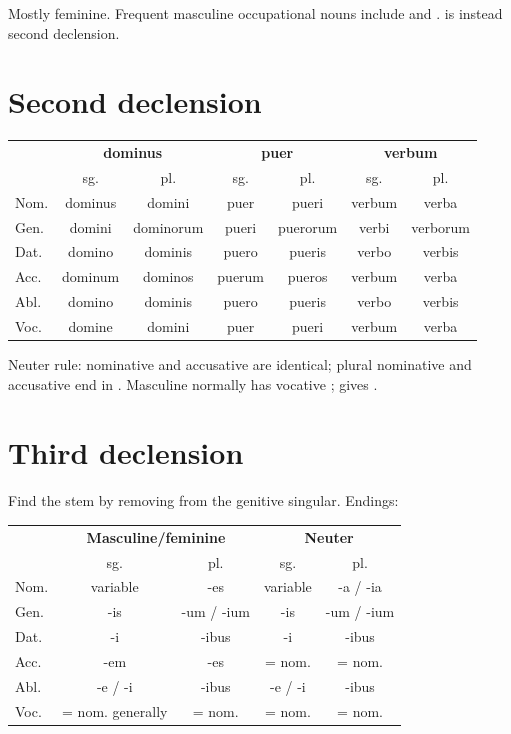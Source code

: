 Mostly feminine. Frequent masculine occupational nouns include
 and . 
is instead second declension.

\section{Second declension}

\begin{center}\small
\begin{tabular}{@{}lcccccc@{}}
  \toprule & \multicolumn{2}{c}{\textbf{dominus}} &
  \multicolumn{2}{c}{\textbf{puer}} & \multicolumn{2}{c}{\textbf{verbum}} \\
  & sg. & pl. & sg. & pl. & sg. & pl. \\
  \midrule
  Nom. & dominus & domini & puer & pueri & verbum & verba \\
  Gen. & domini & dominorum & pueri & puerorum & verbi & verborum \\
  Dat. & domino & dominis & puero & pueris & verbo & verbis \\
  Acc. & dominum & dominos & puerum & pueros & verbum & verba \\
  Abl. & domino & dominis & puero & pueris & verbo & verbis \\
  Voc. & domine & domini & puer & pueri & verbum & verba \\
  \bottomrule
\end{tabular}
\end{center}

Neuter rule: nominative and accusative are identical; plural nominative and
accusative end in . Masculine  normally has vocative
;  gives .

\section{Third declension}

Find the stem by removing  from the genitive singular. Endings:

\begin{center}
\begin{tabular}{@{}lcccc@{}}
  \toprule & \multicolumn{2}{c}{\textbf{Masculine/feminine}} &
  \multicolumn{2}{c}{\textbf{Neuter}} \\
  & sg. & pl. & sg. & pl. \\
  \midrule
  Nom. & variable & -es & variable & -a / -ia \\
  Gen. & -is & -um / -ium & -is & -um / -ium \\
  Dat. & -i & -ibus & -i & -ibus \\
  Acc. & -em & -es & = nom. & = nom. \\
  Abl. & -e / -i & -ibus & -e / -i & -ibus \\
  Voc. & = nom. generally & = nom. & = nom. & = nom. \\
  \bottomrule
\end{tabular}
\end{center}


